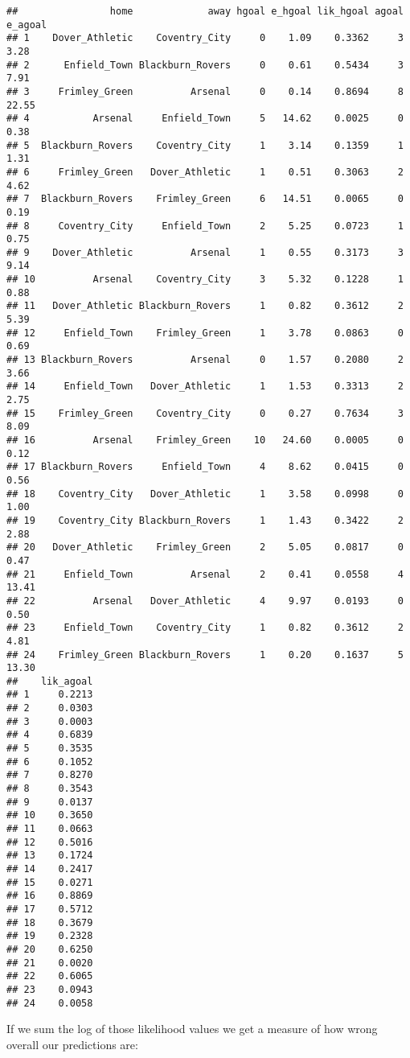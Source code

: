 \documentclass[]{article}
\begin{document}
\begin{verbatim}
##                home             away hgoal e_hgoal lik_hgoal agoal e_agoal
## 1    Dover_Athletic    Coventry_City     0    1.09    0.3362     3    3.28
## 2      Enfield_Town Blackburn_Rovers     0    0.61    0.5434     3    7.91
## 3     Frimley_Green          Arsenal     0    0.14    0.8694     8   22.55
## 4           Arsenal     Enfield_Town     5   14.62    0.0025     0    0.38
## 5  Blackburn_Rovers    Coventry_City     1    3.14    0.1359     1    1.31
## 6     Frimley_Green   Dover_Athletic     1    0.51    0.3063     2    4.62
## 7  Blackburn_Rovers    Frimley_Green     6   14.51    0.0065     0    0.19
## 8     Coventry_City     Enfield_Town     2    5.25    0.0723     1    0.75
## 9    Dover_Athletic          Arsenal     1    0.55    0.3173     3    9.14
## 10          Arsenal    Coventry_City     3    5.32    0.1228     1    0.88
## 11   Dover_Athletic Blackburn_Rovers     1    0.82    0.3612     2    5.39
## 12     Enfield_Town    Frimley_Green     1    3.78    0.0863     0    0.69
## 13 Blackburn_Rovers          Arsenal     0    1.57    0.2080     2    3.66
## 14     Enfield_Town   Dover_Athletic     1    1.53    0.3313     2    2.75
## 15    Frimley_Green    Coventry_City     0    0.27    0.7634     3    8.09
## 16          Arsenal    Frimley_Green    10   24.60    0.0005     0    0.12
## 17 Blackburn_Rovers     Enfield_Town     4    8.62    0.0415     0    0.56
## 18    Coventry_City   Dover_Athletic     1    3.58    0.0998     0    1.00
## 19    Coventry_City Blackburn_Rovers     1    1.43    0.3422     2    2.88
## 20   Dover_Athletic    Frimley_Green     2    5.05    0.0817     0    0.47
## 21     Enfield_Town          Arsenal     2    0.41    0.0558     4   13.41
## 22          Arsenal   Dover_Athletic     4    9.97    0.0193     0    0.50
## 23     Enfield_Town    Coventry_City     1    0.82    0.3612     2    4.81
## 24    Frimley_Green Blackburn_Rovers     1    0.20    0.1637     5   13.30
##    lik_agoal
## 1     0.2213
## 2     0.0303
## 3     0.0003
## 4     0.6839
## 5     0.3535
## 6     0.1052
## 7     0.8270
## 8     0.3543
## 9     0.0137
## 10    0.3650
## 11    0.0663
## 12    0.5016
## 13    0.1724
## 14    0.2417
## 15    0.0271
## 16    0.8869
## 17    0.5712
## 18    0.3679
## 19    0.2328
## 20    0.6250
## 21    0.0020
## 22    0.6065
## 23    0.0943
## 24    0.0058
\end{verbatim}

If we sum the log of those likelihood values we get a measure of how
wrong overall our predictions are:
\end{document}
